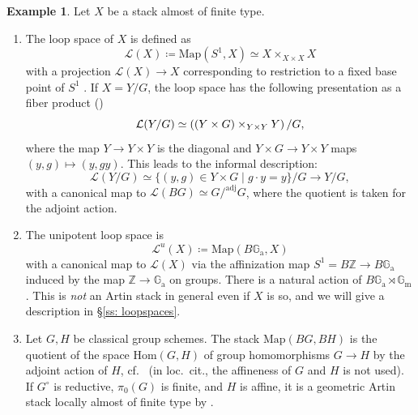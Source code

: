 \documentclass{amsart}
\theoremstyle{definition}
\newtheorem{example}[theorem]{Example}
\theoremstyle{remark}
\numberwithin{equation}{section}
\newcommand{\mc}{\mathcal}
\newcommand{\Z}{\mathbb{Z}}
\newcommand{\Gm}{{\mathbb{G}_{\mathrm{m}}}}
\newcommand{\Hom}{\mathrm{Hom}}
\newcommand{\Ga}{\mathbb{G}_{\mathrm{a}}}
\newcommand{\Map}{\mathrm{Map}}
\newcommand{\adj}{\mathrm{adj}}
\begin{document}
\begin{example}\label{ex: ExamplesDerivedStacks}
Let $X$ be a stack almost of finite type. 

\begin{enumerate}
    \item The loop space of $X$ is defined as 
    \[
    \mc L(X)\coloneq \Map (S^1, X)\simeq X\times_{X\times X}X
    \]
    with a projection $\mc L(X)\to X$ corresponding to restriction to a fixed base point of $S^1$ \cite[Definition 2.1.3]{Chenequivariant}. If $X=Y/G$,  the loop space has the following presentation as a fiber product (\cite[Proposition 2.1.8]{Chenequivariant})
    \begin{equation}{\label{eqn: chenfiberprod}}
  \mc{L}(Y/G) \simeq \left( (Y \times G)\times_{Y \times Y} Y \right) / G,
    \end{equation}
    where the map $Y \rightarrow Y \times Y$ is the diagonal and $Y \times G \rightarrow Y \times Y$ maps $(y,g) \mapsto (y, gy)$. This leads to the informal description:
    \[
    \mc L(Y/G)\simeq \{ (y, g)\in Y\times G \mid g\cdot y=y\} /G \to Y/G,
    \]
    with a canonical map to $\mc L(BG)\simeq G/^\adj G$, where the quotient is taken for the adjoint action. 
    \item The unipotent loop space \cite[Definition 2.1.3]{Chenequivariant} is 
    \[
    \mc L^u (X)\coloneq\Map (B\Ga, X)
    \]
    with a canonical map to $\mc L(X)$ via the affinization map $S^1 = B\Z \to B\Ga$ induced by the map $\Z \rightarrow \Ga$ on groups. There is a natural action of $B\Ga \rtimes \Gm$. This is \emph{not} an Artin stack in general even if $X$ is so, and we will give a description in \S \ref{ss: loopspaces}. 
    \item Let $G, H$ be classical group schemes. The stack $\Map (BG, BH)$ is the quotient of the space $\Hom(G, H)$ of group homomorphisms $G\to H$ by the adjoint action of $H$, cf.~\cite[Proposition 2.1.22]{Chenequivariant} (in loc.~cit., the affineness of $G$ and $H$ is not used). If $G^{\circ}$ is reductive, $\pi_0(G)$ is finite, and $H$ is affine, it is a geometric Artin stack locally almost of finite type by \cite[Example 1.2.4]{HalpernLeistnerPreygel}. 
    

\end{enumerate}
\end{example}
\end{document}
